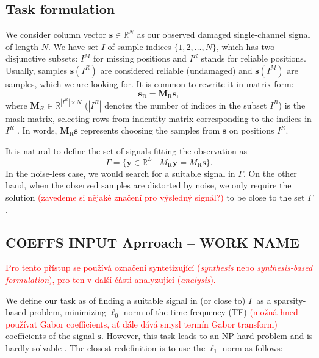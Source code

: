 \documentclass[conference]{IEEEtran}
\newcommand{\todo}[1]{\textcolor{red}{#1}}
\begin{document}
\subsection{Task formulation}

We consider column vector $ \mathbf{s} \in \mathbb{R}^{N} $ as our observed damaged single-channel signal of length $ N $.
We have set $ I $ of sample indices $ \{1,2,\dots,N\} $, which has two disjunctive subsets: $ I^M $ for missing positions and $ I^R $ stands for reliable positions.
Usually, samples $ \mathbf{s}(I^R) $ are considered reliable (undamaged) and $ \mathbf{s}(I^M) $ are samples, which we are looking for.
It is common to rewrite it in matrix form:
\begin{equation*}
	\mathbf{s}_{\mathrm{R}} = \mathbf{M}_{\mathrm{R}}\mathbf{s},
\end{equation*}
where $\mathbf{M}_{R} \in \mathbb{R} ^ { |I^R| \times N}$ ($ |I^R|$ denotes the number of indices in the subset $I^R$) is the mask matrix, selecting rows from indentity matrix corresponding to the indices in $I^R$ \cite{Adler2012}.
In words, $\mathbf{M}_{\mathrm{R}}\mathbf{s}$ represents choosing the samples from $\mathbf{s}$ on positions $I^R$.

It is natural to define the set of signals fitting the observation as
\begin{equation}
	\label{eq:Gamma}
	\Gamma = \lbrace \mathbf {y}\in \mathbb {R}^L\mid M_{\mathrm{R}}\mathbf {y}=M_{\mathrm{R}}\mathbf {s}\rbrace.
\end{equation}
In the noise-less case, we would search for a suitable signal in $\Gamma$.
On the other hand, when the observed samples are distorted by noise, we only require the solution \todo{(zavedeme si nějaké značení pro výsledný signál?)} to be close to the set $\Gamma$.


\subsection{COEFFS INPUT Aprroach -- WORK NAME}\label{subsec:freqcoef}
\todo{Pro tento přístup se používá označení syntetizující (\textit{synthesis} nebo \textit{synthesis-based formulation}), pro ten v další části analyzující (\textit{analysis}).}

We define our task as of finding a suitable signal in (or close to) $\Gamma$ as a sparsity-based problem, minimizing $ \ell_0 $-norm of the time-frequency (TF) \todo{(možná hned používat Gabor coefficients, ať dále dává smysl termín Gabor transform)} coefficients of the signal $ \mathbf{s} $.
However, this task leads to an NP-hard problem and is hardly solvable \cite{Mokry2020}.
The closest redefinition is to use the $ \ell_1 $ norm as follows:
\end{document}
